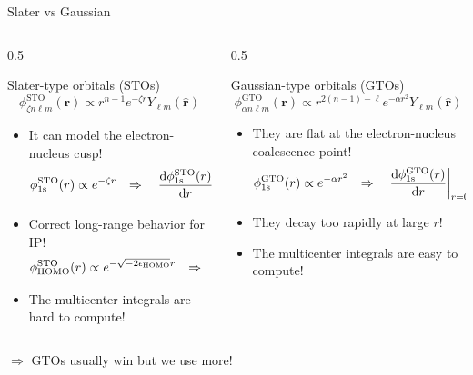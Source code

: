 \documentclass[aspectratio=169,9pt]{beamer}
\newcommand{\br}{\boldsymbol{r}}
\newcommand{\red}[1]{\textcolor{hfRed}{#1}}
\newcommand{\green}[1]{\textcolor{hfGreen}{#1}}
\newcommand{\cmark}{\textbf{\green{\ding{51}}}}
\newcommand{\xmark}{\textbf{\red{\ding{55}}}}
\begin{document}
\begin{frame}{Slater vs Gaussian}
	\begin{columns}
		\begin{column}[t]{0.5\textwidth}
			\begin{block}{Slater-type orbitals (STOs)}
				\begin{equation*}
					\boxed{\phi_{\zeta n\ell m}^\text{STO}(\br) \propto r^{n-1} e^{-\zeta r} Y_{\ell m}(\hat{\br})}
				\end{equation*}
				\begin{itemize}
    				\item[$\cmark$] It can model the electron-nucleus cusp!
					\begin{equation*}
    					\phi_\text{1s}^\text{STO}(r) \propto e^{-\zeta r}  
    					\qq{$\Rightarrow$}
    					\eval{\dv{\phi_\text{1s}^\text{STO}(r)}{r}}_{r=0} = - \zeta
    				\end{equation*}
    				\item[$\cmark$] Correct long-range behavior for IP!
    				\begin{equation*}
    					\phi_\text{HOMO}^\text{STO}(r) \propto e^{-\sqrt{-2\epsilon_\text{HOMO}}r}  
    					\qq{$\Rightarrow$}
    					\text{IP} = - \epsilon_\text{HOMO}
    				\end{equation*}
					\item[$\xmark$] The multicenter integrals are \alert{hard} to compute!
				\end{itemize}    				
			\end{block}
		\end{column}
		\begin{column}[t]{0.5\textwidth}
			\begin{block}{Gaussian-type orbitals (GTOs)}
				\begin{equation*}
					\boxed{\phi_{\alpha n\ell m}^\text{GTO}(\br) \propto r^{2(n-1)-\ell} e^{-\alpha r^2} Y_{\ell m}(\hat{\br})}
				\end{equation*}
				\begin{itemize}
    				\item[$\xmark$] They are flat at the electron-nucleus coalescence point!
					\begin{equation*}
    					\phi_\text{1s}^\text{GTO}(r) \propto e^{-\alpha r^2}  
    					\qq{$\Rightarrow$}
    					\eval{\dv{\phi_\text{1s}^\text{GTO}(r)}{r}}_{r=0} = 0
    				\end{equation*}			
    				\item[$\xmark$] They decay too rapidly at large $r$!
					\item[$\cmark$] The multicenter integrals are \green{easy} to compute!
				\end{itemize}    				
			\end{block}
		\end{column}
	\end{columns}
	\vfill
	\centering
	$\Rightarrow$ \alert{GTOs usually win but we use more!}
\end{frame}
\end{document}
